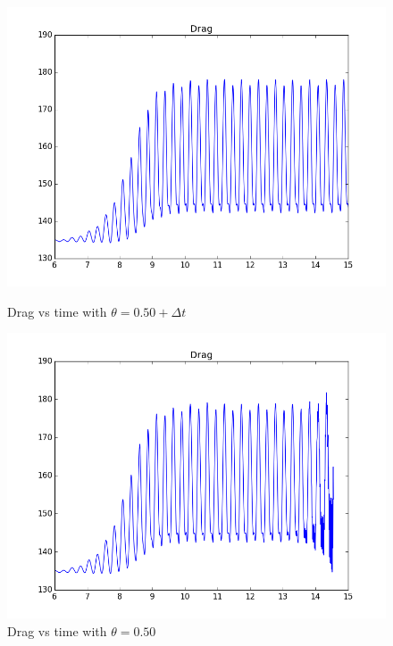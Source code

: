 \begin{figure}[H] 
  \begin{minipage}[b]{0.6\linewidth}
    \centering
    \includegraphics[scale=0.40]{./Temporal_stability/FSI2_001_051_big.png} 
    \caption{Drag vs time with $\theta = 0.50 + \Delta t $} 
    \vspace{4ex}
  \end{minipage}%
  \begin{minipage}[b]{0.6\linewidth}
    \centering
    \includegraphics[scale=0.40]{./Temporal_stability/FSI2_001_050_big.png} 
    \caption{Drag vs time with $\theta = 0.50 $} 
    \vspace{4ex}
  \end{minipage} 
  \begin{minipage}[b]{0.6\linewidth}

\end{minipage}
\end{figure}
